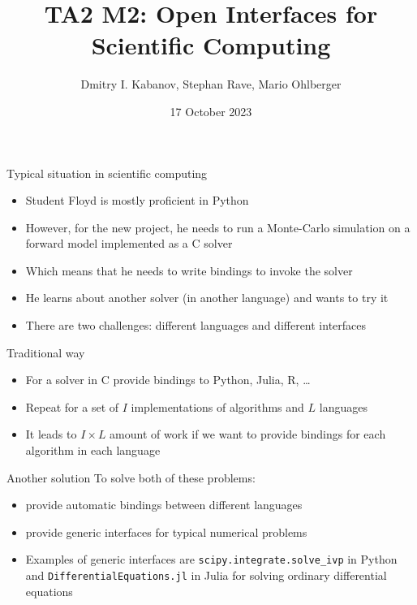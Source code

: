 \documentclass[10pt, aspectratio=169, progressbar=frametitle]{beamer}
\title{TA2 M2: Open Interfaces for Scientific Computing}
\author{Dmitry I. Kabanov, Stephan Rave, Mario Ohlberger}
\institute{University of Münster}
\date{17 October 2023}
\begin{document}
\maketitle

\begin{frame}{Typical situation in scientific computing}
  \begin{itemize}
    \item Student Floyd is mostly proficient in Python
    \item However, for the new project, he needs to run a Monte-Carlo
          simulation on a forward model implemented as a C solver
    \item Which means that he needs to write bindings to invoke the solver
    \item He learns about another solver (in another language) and wants to try it
    \item There are \alert{two challenges:} different languages and different interfaces
  \end{itemize}
\end{frame}

\begin{frame}{Traditional way}
  \begin{minipage}{0.45\textwidth}
    \begin{itemize}
      \item For a solver in C provide bindings to Python, Julia, R, \dots
      \item Repeat for a set of $I$ implementations of algorithms and $L$ languages
      \item It leads to $I \times L$ amount of work if we want to provide
            bindings for each algorithm in each language
    \end{itemize}
  \end{minipage}\hfill
  \begin{minipage}{0.45\textwidth}
    
  \end{minipage}
\end{frame}

\begin{frame}{Another solution}
  To solve both of these problems:
  \begin{itemize}
    \item provide automatic bindings between different languages
    \item provide generic interfaces for typical numerical problems
    \item Examples of generic interfaces are \texttt{scipy.integrate.solve\_ivp} in Python
          and \texttt{DifferentialEquations.jl} in Julia for solving ordinary
          differential equations
  \end{itemize}
\end{frame}
\end{document}
